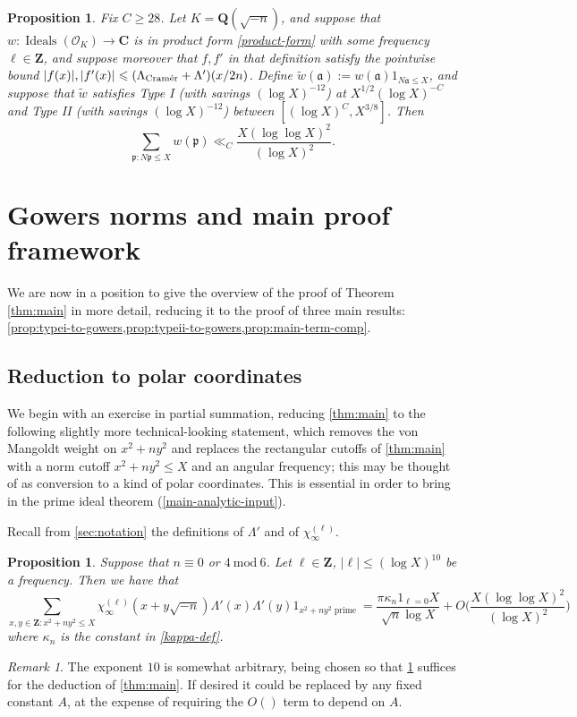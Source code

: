\documentclass[11pt,reqno]{amsart}
\numberwithin{equation}{section}
\newtheorem{proposition}[theorem]{Proposition}
\theoremstyle{definition}
\theoremstyle{remark}
\newtheorem*{remark}{Remark}
\newcommand{\mf}{\mathfrak}
\newcommand{\imod}[1]{~\mathrm{mod}~#1}
\renewcommand{\le}{\leqslant}
\renewcommand{\ge}{\geqslant}
\newcommand\Z{\mathbf{Z}}
\newcommand\Q{\mathbf{Q}}
\newcommand\C{\mathbf{C}}
\newcommand\cramer{{\textnormal{Cram\'er}}}
\newcommand\Ideals{\operatorname{Ideals}}
\renewcommand\O{\mathcal{O}}
\begin{document}
\begin{proposition}\label{prop:main-sec3}
Fix $C\ge 28$. Let $K = \Q(\sqrt{-n})$, and suppose that $w : \Ideals(\O_K) \rightarrow \C$ is in product form \cref{product-form} with some frequency $\ell \in \Z$, and suppose moreover that $f, f'$ in that definition satisfy the pointwise bound $|f(x)|, |f'(x)|  \le (\Lambda_{\cramer} + \Lambda')(x/2n)$. Define $\tilde w(\mf{a}) := w(\mf{a}) 1_{N\mf{a} \le X}$, and suppose that $\tilde w$ satisfies Type I \textup{(}with savings $(\log X)^{-12}$\textup{)} at $X^{1/2}(\log X)^{-C}$ and Type II \textup{(}with savings $(\log X)^{-12}$\textup{)} between $[(\log X)^{C}, X^{3/8}]$. Then
\[\sum_{\mf{p} : N\mf{p} \le X} w(\mf{p}) \ll_{C} \frac{X (\log \log X)^{2}}{(\log X)^2} .\] 
\end{proposition}

\section{Gowers norms and main proof framework}\label{section4}

We are now in a position to give the overview of the proof of Theorem \ref{thm:main} in more detail, reducing it to the proof of three main results: \cref{prop:typei-to-gowers,prop:typeii-to-gowers,prop:main-term-comp}.

\subsection{Reduction to polar coordinates}\label{polar-sec}

We begin with an exercise in partial summation, reducing \cref{thm:main} to the following slightly more technical-looking statement, which removes the von Mangoldt weight on $x^2 + ny^2$ and replaces the rectangular cutoffs of \cref{thm:main} with a norm cutoff $x^2 + ny^2 \le X$ and an angular frequency; this may be thought of as conversion to a kind of polar coordinates. This is essential in order to bring in the prime ideal theorem (\cref{main-analytic-input}).

Recall from \cref{sec:notation} the definitions of $\Lambda'$ and of $\chi_{\infty}^{(\ell)}$.

\begin{proposition}\label{prop:main}
Suppose that $n \equiv 0$ or $4 \imod 6$. Let $\ell\in \Z$, $|\ell| \le (\log X)^{10}$ be a frequency. Then we have that 
\[\sum_{x, y \in \Z: x^2 + ny^2 \le X}\chi_{\infty}^{(\ell)}(x + y \sqrt{-n})\Lambda'(x)\Lambda'(y)1_{x^2 + ny^2 \operatorname{prime}} = \frac{\pi \kappa_n 1_{\ell = 0} X}{\sqrt{n} \log X} + O\bigg(\frac{X(\log\log X)^{2}}{(\log X)^2}\bigg)\]
where $\kappa_n$ is the constant in \cref{kappa-def}.
\end{proposition}
\begin{remark}
The exponent $10$ is somewhat arbitrary, being chosen so that \cref{prop:main} suffices for the deduction of \cref{thm:main}. If desired it could be replaced by any fixed constant $A$, at the expense of requiring the $O()$ term to depend on $A$. 
\end{remark}
\end{document}
